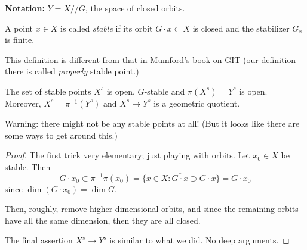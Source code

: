 {\bf Notation:} $Y=X/\!/G$, the space of
closed orbits.

\begin{definition}
\label{definition-stable-point}
A point $x \in X$ is called {\it stable} if
its orbit $G\cdot x \subset X$ is closed and
the stabilizer  $G_x$ is finite.
\end{definition}

This definition is different from that in
Mumford's book on GIT (our definition there
is called {\it properly} stable point.)

\begin{proposition}
\label{proposition-stable-points}
The set of stable points $X^s$ is open,
$G$-stable and $\pi(X^s)=Y^s$ is open.
Moreover, $X^s=\pi^{-1}(Y^s)$ and $X^s \to
Y^s$ is a geometric quotient.
\end{proposition}

Warning: there might not be any stable points
at all! (But it looks like there are some
ways to get around this.)

\begin{proof}
The first trick very elementary; just playing
with orbits. Let $x_0 \in X$ be stable. Then
$$
G\cdot x_0 \subset \pi^{-1}\pi(x_0)=\{ x \in
X
: \overline{G\cdot x}\supset G\cdot
x\}=G\cdot x_0
$$
since $\dim (G\cdot x_0)=\dim G$.

Then, roughly, remove higher dimensional
orbits, and since the remaining orbits have
all the same dimension, then they are all
closed.

The final assertion $X^s \to Y^s$ is similar
to what we did. No deep arguments.
\end{proof}

